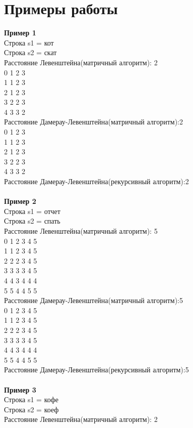\documentclass[a4paper,12pt]{report}
\begin{document}
\section{Примеры работы}
\textbf {Пример 1}\\
Строка s1 = кот\\
Строка s2 = скат\\
Расстояние Левенштейна(матричный алгоритм): 2\\
0 1 2 3\\
1 1 2 3\\
2 1 2 3\\
3 2 2 3\\
4 3 3 2\\
Расстояние Дамерау-Левенштейна(матричный алгоритм):2\\
0 1 2 3\\
1 1 2 3\\
2 1 2 3\\
3 2 2 3\\
4 3 3 2\\
Расстояние Дамерау-Левенштейна(рекурсивный алгоритм):2\\\\
\textbf {Пример 2}\\
Строка s1 = отчет\\
Строка s2 = спать\\
Расстояние Левенштейна(матричный алгоритм): 5\\
0 1 2 3 4 5\\
1 1 2 3 4 5\\
2 2 2 3 4 5\\
3 3 3 3 4 5\\
4 4 3 4 4 4\\
5 5 4 4 5 5\\
Расстояние Дамерау-Левенштейна(матричный алгоритм):5\\
0 1 2 3 4 5\\
1 1 2 3 4 5\\
2 2 2 3 4 5\\
3 3 3 3 4 5\\
4 4 3 4 4 4\\
5 5 4 4 5 5\\
Расстояние Дамерау-Левенштейна(рекурсивный алгоритм):5\\\\
\textbf {Пример 3}\\
Строка s1 = кофе\\
Строка s2 = коеф\\
Расстояние Левенштейна(матричный алгоритм): 2\\
\end{document}
